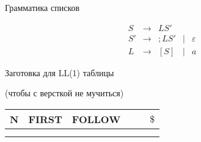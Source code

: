 \documentclass[12pt]{article}
\begin{document}
\bigskip

\begin{center} Грамматика списков \end{center}

    $$
    \begin{array}{cccccccccc}
       &S & \rightarrow & L S' \\
       &S'& \rightarrow & ; L S' & \mid & \varepsilon \\
       &L & \rightarrow &  [S] & \mid & a
    \end{array}
    $$

    \bigskip

    \begin{center} Заготовка для LL(1) таблицы

    (чтобы с версткой не мучиться)
    \end{center}
    \begin{center}
    \begin{tabular}{ l || c | c || c | c | c }
      N & FIRST & FOLLOW &  &  & $ \$ $ \\ \hline
        &       &        &  &  & \\
        &       &        &  &  &

    \end{tabular}
    \end{center}
\end{document}
